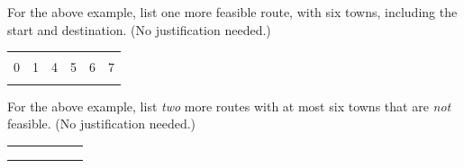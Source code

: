 \documentclass[11pt,fleqn]{exam}
\newenvironment{soln}{\color{solnblue}}{}
\begin{document}
\begin{questions}
\question[1]
For the above example, list one more feasible route, with six towns, including the start and destination.
(No justification needed.)

\begin{center}
\begin{tabular}{|c|c|c|c|c|c|} \hline
\hspace{.5in} &\hspace{.5in} &\hspace{.5in} &\hspace{.5in} &\hspace{.5in} &\hspace{.5in} \\
0 & 1 & 4 & 5 & 6 & 7 \\
\hspace{.5in} &\hspace{.5in} &\hspace{.5in} &\hspace{.5in} &\hspace{.5in} &\hspace{.5in} \\ \hline
\end{tabular}
\end{center}

\question[2]
For the above example, list {\em two} more routes with at most six towns that are {\em not} feasible.
(No justification needed.)

\begin{soln}
\begin{center}
\begin{tabular}{|c|c|c|c|c|c|} \hline
\hspace{.5in} &\hspace{.5in} &\hspace{.5in} &\hspace{.5in} &\hspace{.5in} &\hspace{.5in} \\
 &  &  &  &  &  \\
\hspace{.5in} &\hspace{.5in} &\hspace{.5in} &\hspace{.5in} &\hspace{.5in} &\hspace{.5in} \\ \hline
\end{tabular}
\end{center}


\end{soln}
\end{questions}
\end{document}
